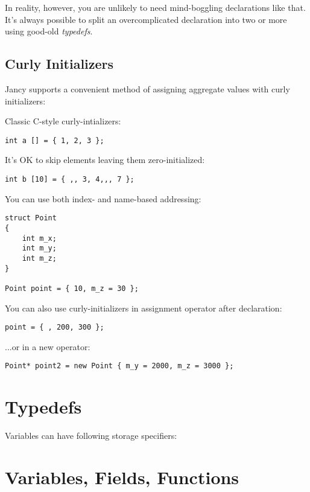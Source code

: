 \documentclass[oneside]{book}
\begin{document}
In reality, however, you are unlikely to need mind-boggling declarations like that. It's always possible to split an overcomplicated declaration into two or more using good-old \emph{typedefs}.

\subsection{Curly Initializers}
Jancy supports a convenient method of assigning aggregate values with curly initializers:

Classic C-style curly-intializers:

\begin{lstlisting}
int a [] = { 1, 2, 3 };
\end{lstlisting}

It's OK to skip elements leaving them zero-initialized:

\begin{lstlisting}
int b [10] = { ,, 3, 4,,, 7 };
\end{lstlisting}

You can use both index- and name-based addressing:

\begin{lstlisting}
struct Point
{
    int m_x;
    int m_y;
    int m_z;
}
    
Point point = { 10, m_z = 30 };
\end{lstlisting}

You can also use curly-initializers in assignment operator after declaration:

\begin{lstlisting}
point = { , 200, 300 };
\end{lstlisting}

...or in a new operator:

\begin{lstlisting}
Point* point2 = new Point { m_y = 2000, m_z = 3000 };
\end{lstlisting}

\section{Typedefs}

Variables can have following storage specifiers:

\section{Variables, Fields, Functions}
\end{document}
